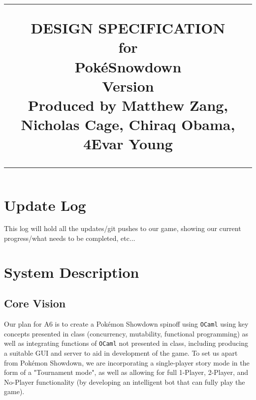\documentclass{scrreprt}
\title{%
\flushleft
\rule{16cm}{5pt}\vskip1cm
\Huge{DESIGN SPECIFICATION}\\
for\\
Pok\'eSnowdown \\
\vspace{2cm}
\LARGE{Version \myversion\\}
\vspace{2cm}
Produced by Matthew Zang, Nicholas Cage, Chiraq Obama, 4Evar Young\\
\vfill
\rule{16cm}{5pt}
}
\date{}
\begin{document}
\maketitle
\tableofcontents
\restoregeometry
\section{Update Log}

This log will hold all the updates/git pushes to our game, showing our current progress/what needs to be completed, etc...

\pagebreak 
\section{System Description}
\subsection{Core Vision}

Our plan for A6 is to create a Pok\'emon Showdown spinoff using \texttt{OCaml} using key concepts presented in class (concurrency, mutability, functional programming) as well as integrating functions of \texttt{OCaml} not presented in class, including producing a suitable GUI and server to aid in development of the game. To set us apart from Pok\'emon Showdown, we are incorporating a single-player story mode in the form of a "Tournament mode", as well as allowing for full 1-Player, 2-Player, and No-Player functionality (by developing an intelligent bot that can fully play the game).
\end{document}
